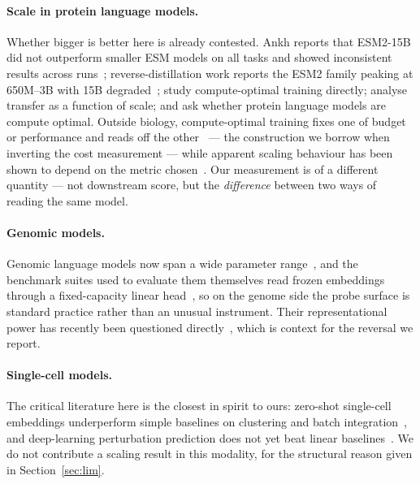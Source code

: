 \documentclass[11pt]{article}
\begin{document}
\paragraph{Scale in protein language models.} Whether bigger is better here is
already contested. Ankh reports that ESM2-15B did not outperform smaller ESM
models on all tasks and showed inconsistent results across
runs~\citep{elnaggar2023ankh}; reverse-distillation work reports the ESM2 family
peaking at 650M--3B with 15B degraded~\citep{catrina2026reverse};
\citet{cheng2024computeoptimal} study compute-optimal training directly;
\citet{li2024featurereuse} analyse transfer as a function of scale; and
\citet{serrano2024computeoptimal} ask whether protein language models are compute
optimal. Outside biology, compute-optimal training fixes one of budget or
performance and reads off the other~\citep{hoffmann2022chinchilla} --- the
construction we borrow when inverting the cost measurement --- while apparent
scaling behaviour has been shown to depend on the metric
chosen~\citep{schaeffer2023mirage}. Our measurement is of a different quantity ---
not downstream score, but the \emph{difference} between two ways of reading the
same model.

\paragraph{Genomic models.} Genomic language models now span a wide parameter
range~\citep{nguyen2024evo}, and the benchmark suites used to evaluate them
themselves read frozen embeddings through a fixed-capacity linear
head~\citep{gresova2023genomic,marin2023bend}, so on the genome side the probe
surface is standard practice rather than an unusual instrument. Their
representational power has recently been questioned
directly~\citep{tang2025dnaeval}, which is context for the reversal we report.

\paragraph{Single-cell models.} The critical literature here is the closest in
spirit to ours: zero-shot single-cell embeddings underperform simple baselines on
clustering and batch integration~\citep{kedzierska2025singlecell}, and
deep-learning perturbation prediction does not yet beat linear
baselines~\citep{ahlmanneltze2025perturbation}. We do not contribute a scaling
result in this modality, for the structural reason given in Section~\ref{sec:lim}.
\end{document}
